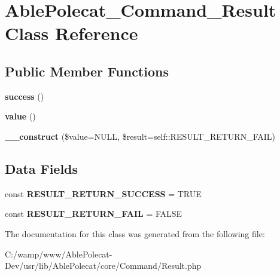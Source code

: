 \hypertarget{class_able_polecat___command___result}{}\section{Able\+Polecat\+\_\+\+Command\+\_\+\+Result Class Reference}
\label{class_able_polecat___command___result}
\subsection*{Public Member Functions}
\begin{DoxyCompactItemize}
\item 
\hypertarget{class_able_polecat___command___result_ae3aaa78a09e613892295d90324f6a4c0}{}{\bfseries success} ()\label{class_able_polecat___command___result_ae3aaa78a09e613892295d90324f6a4c0}

\item 
\hypertarget{class_able_polecat___command___result_aefbfa229f1c9e1fc967bff724a010f9e}{}{\bfseries value} ()\label{class_able_polecat___command___result_aefbfa229f1c9e1fc967bff724a010f9e}

\item 
\hypertarget{class_able_polecat___command___result_ab1eb7374f5ba22aea5bfafe4ea236301}{}{\bfseries \+\_\+\+\_\+construct} (\$value=N\+U\+L\+L, \$result=self\+::\+R\+E\+S\+U\+L\+T\+\_\+\+R\+E\+T\+U\+R\+N\+\_\+\+F\+A\+I\+L)\label{class_able_polecat___command___result_ab1eb7374f5ba22aea5bfafe4ea236301}

\end{DoxyCompactItemize}
\subsection*{Data Fields}
\begin{DoxyCompactItemize}
\item 
\hypertarget{class_able_polecat___command___result_a344660c3178da3b30835095b04aae7a2}{}const {\bfseries R\+E\+S\+U\+L\+T\+\_\+\+R\+E\+T\+U\+R\+N\+\_\+\+S\+U\+C\+C\+E\+S\+S} = T\+R\+U\+E\label{class_able_polecat___command___result_a344660c3178da3b30835095b04aae7a2}

\item 
\hypertarget{class_able_polecat___command___result_a1735eba029860bd4f29a389bf1ef6559}{}const {\bfseries R\+E\+S\+U\+L\+T\+\_\+\+R\+E\+T\+U\+R\+N\+\_\+\+F\+A\+I\+L} = F\+A\+L\+S\+E\label{class_able_polecat___command___result_a1735eba029860bd4f29a389bf1ef6559}

\end{DoxyCompactItemize}


The documentation for this class was generated from the following file\+:\begin{DoxyCompactItemize}
\item 
C\+:/wamp/www/\+Able\+Polecat-\/\+Dev/usr/lib/\+Able\+Polecat/core/\+Command/Result.\+php\end{DoxyCompactItemize}
